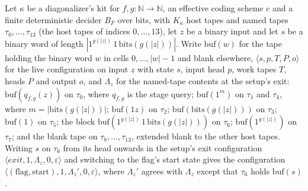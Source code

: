 \begin{theorem}
\label{Turing.NTimeDiag.dz_handoff}
\leanok
{}
Let $\kappa$ be a diagonalizer's kit for $f, g : \mathbb{N} \to \mathbb{N}$, an effective coding scheme $c$ and a finite deterministic decider $B_F$ over bits, with $K_\kappa$ host tapes and named tapes $\tau_0, \dots, \tau_{13}$ (the host tapes of indices $0, \dots, 13$), let $z$ be a binary input and let $s$ be a binary word of length $|1^{g(|z|)}\,1\,\mathrm{bits}(g(|z|))|$. Write $\mathrm{buf}(w)$ for the tape holding the binary word $w$ in cells $0, \dots, |w| - 1$ and blank elsewhere, $\langle s, p, T, P, o\rangle$ for the live configuration on input $z$ with state $s$, input head $p$, work tapes $T$, heads $P$ and output $o$, and $\Lambda_z$ for the named-tape contents at the setup's exit: $\mathrm{buf}(q_{f,g}(z))$ on $\tau_0$, where $q_{f,g}$ is the stage query; $\mathrm{buf}(1^m)$ on $\tau_1$ and $\tau_4$, where $m = |\mathrm{bits}(g(|z|))|$; $\mathrm{buf}(1z)$ on $\tau_2$; $\mathrm{buf}(\mathrm{bits}(g(|z|)))$ on $\tau_3$; $\mathrm{buf}(1)$ on $\tau_5$; the block $\mathrm{buf}(1^{g(|z|)}\,1\,\mathrm{bits}(g(|z|)))$ on $\tau_6$; $\mathrm{buf}(1^{g(|z|)})$ on $\tau_7$; and the blank tape on $\tau_8, \dots, \tau_{13}$, extended blank to the other host tapes. Writing $s$ on $\tau_6$ from its head onwards in the setup's exit configuration $\langle \mathit{exit}, 1, \Lambda_z, 0, \varepsilon\rangle$ and switching to the flag's start state gives the configuration $\langle (\text{flag}, \text{start}), 1, \Lambda_z', 0, \varepsilon\rangle$, where $\Lambda_z'$ agrees with $\Lambda_z$ except that $\tau_6$ holds $\mathrm{buf}(s)$.
\end{theorem}

